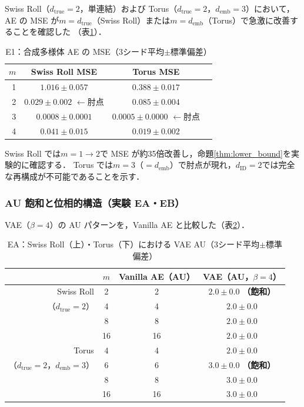 \documentclass[11pt,a4paper]{jsarticle}
\newcommand{\dID}{d_{\mathrm{ID}}}
\newcommand{\dtrue}{d_{\mathrm{true}}}
\newcommand{\demb}{d_{\mathrm{emb}}}
\begin{document}
Swiss Roll（$\dtrue = 2$，単連結）および Torus（$\dtrue = 2$，$\demb = 3$）において，
AE の MSE が$m = \dtrue$（Swiss Roll）または$m = \demb$（Torus）で急激に改善することを確認した
（表\ref{tab:e1}）．

\begin{table}[H]
\centering
\caption{E1：合成多様体 AE の MSE（3シード平均$\pm$標準偏差）}
\label{tab:e1}
\small
\begin{tabular}{rccc}
\toprule
$m$ & Swiss Roll MSE & Torus MSE \\
\midrule
1 & $1.016\pm0.057$ & $0.388\pm0.017$ \\
2 & $\boldsymbol{0.029\pm0.002}$ $\leftarrow$肘点 & $0.085\pm0.004$ \\
3 & $0.0008\pm0.0001$ & $\boldsymbol{0.0005\pm0.0000}$ $\leftarrow$肘点 \\
4 & $0.041\pm0.015$ & $0.019\pm0.002$ \\
\bottomrule
\end{tabular}
\end{table}

Swiss Roll では$m = 1 \to 2$で MSE が約35倍改善し，命題\ref{thm:lower_bound}を実験的に確認する．
Torus では$m = 3$（$= \demb$）で肘点が現れ，$\dID = 2$では完全な再構成が不可能であることを示す．

\subsubsection{AU 飽和と位相的構造（実験 EA・EB）}

VAE（$\beta = 4$）の AU パターンを，Vanilla AE と比較した（表\ref{tab:ea_summary}）．

\begin{table}[H]
\centering
\caption{EA：Swiss Roll（上）・Torus（下）における VAE AU（3シード平均$\pm$標準偏差）}
\label{tab:ea_summary}
\small
\begin{tabular}{rccc}
\toprule
 & $m$ & Vanilla AE（AU） & VAE（AU，$\beta=4$） \\
\midrule
Swiss Roll & 2 & 2 & $2.0\pm0.0$ \textbf{（飽和）} \\
（$\dtrue = 2$） & 4 & 4 & $2.0\pm0.0$ \\
 & 8 & 8 & $2.0\pm0.0$ \\
 & 16 & 16 & $2.0\pm0.0$ \\
\midrule
Torus & 4 & 4 & $2.0\pm0.0$ \\
（$\dtrue = 2$，$\demb = 3$） & 6 & 6 & $3.0\pm0.0$ \textbf{（飽和）} \\
 & 8 & 8 & $3.0\pm0.0$ \\
 & 16 & 16 & $3.0\pm0.0$ \\
\bottomrule
\end{tabular}
\end{table}
\end{document}
